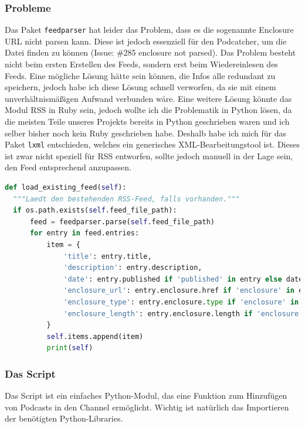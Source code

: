 \documentclass{article}
\begin{document}
\subsubsection{Probleme}
Das Paket \texttt{feedparser} \cite{feedparser} hat leider das Problem, dass es die sogenannte Enclosure URL nicht parsen kann. Diese ist jedoch essenziell für den Podcatcher, um die Datei finden zu können (Issue: \#285 enclosure not parsed). Das Problem besteht nicht beim ersten Erstellen des Feeds, sondern erst beim Wiedereinlesen des Feeds. Eine mögliche Lösung hätte sein können, die Infos alle redundant zu speichern, jedoch habe ich diese Lösung schnell verworfen, da sie mit einem unverhältnismäßigen Aufwand verbunden wäre. Eine weitere Lösung könnte das Modul RSS in Ruby sein, jedoch wollte ich die Problematik in Python lösen, da die meisten Teile unseres Projekts bereits in Python geschrieben waren und ich selber bisher noch kein Ruby geschrieben habe.
Deshalb habe ich mich für das Paket \texttt{lxml} \cite{lxml} entschieden, welches ein generisches XML-Bearbeitungstool ist. Dieses ist zwar nicht speziell für RSS entworfen, sollte jedoch manuell in der Lage sein, den Feed entsprechend anzupassen.

\begin{lstlisting}[language=Python, caption=Feedparser Bug]
def load_existing_feed(self):
  """Laedt den bestehenden RSS-Feed, falls vorhanden."""
  if os.path.exists(self.feed_file_path):
      feed = feedparser.parse(self.feed_file_path)
      for entry in feed.entries:
          item = {
              'title': entry.title,
              'description': entry.description,
              'date': entry.published if 'published' in entry else datetime.now().isoformat(),
              'enclosure_url': entry.enclosure.href if 'enclosure' in entry else None,
              'enclosure_type': entry.enclosure.type if 'enclosure' in entry else None,
              'enclosure_length': entry.enclosure.length if 'enclosure' in entry else None
          }
          self.items.append(item)
          print(self)
\end{lstlisting}

\subsubsection{Das Script}
Das Script ist ein einfaches Python-Modul, das eine Funktion zum Hinzufügen von Podcasts in den Channel ermöglicht. Wichtig ist natürlich das Importieren der benötigten Python-Libraries.
\end{document}
